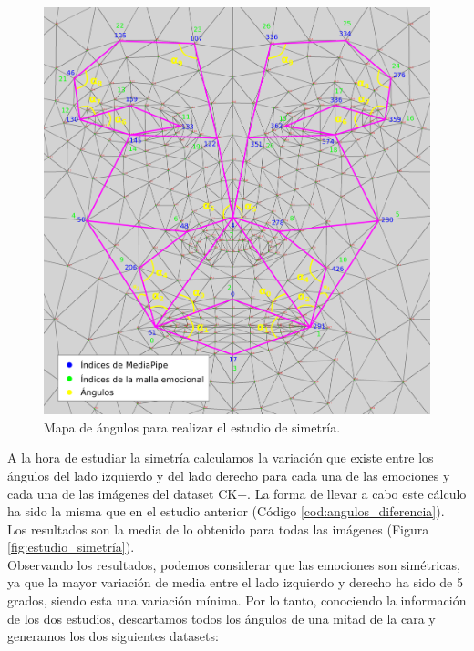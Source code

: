 \begin{figure} [h!]
  \begin{center}
    \includegraphics[width=13cm]{figs/emotional_mesh_2_mitades.png}
  \end{center}
  \captionsetup{justification=centering}
  \caption{Mapa de ángulos para realizar el estudio de simetría.}
  \label{fig:emotional_mesh_2_mitades}
\end{figure}

A la hora de estudiar la simetría calculamos la variación que existe entre los ángulos del lado izquierdo y del lado derecho para cada una de las emociones y cada una de las imágenes del dataset CK+. La forma de llevar a cabo este cálculo ha sido la misma que en el estudio anterior (Código \ref{cod:angulos_diferencia}). Los resultados son la media de lo obtenido para todas las imágenes (Figura \ref{fig:estudio_simetría}).\\

Observando los resultados, podemos considerar que las emociones son simétricas, ya que la mayor variación de media entre el lado izquierdo y derecho ha sido de 5 grados, siendo esta una variación mínima. Por lo tanto, conociendo la información de los dos estudios, descartamos todos los ángulos de una mitad de la cara y generamos los dos siguientes datasets:

